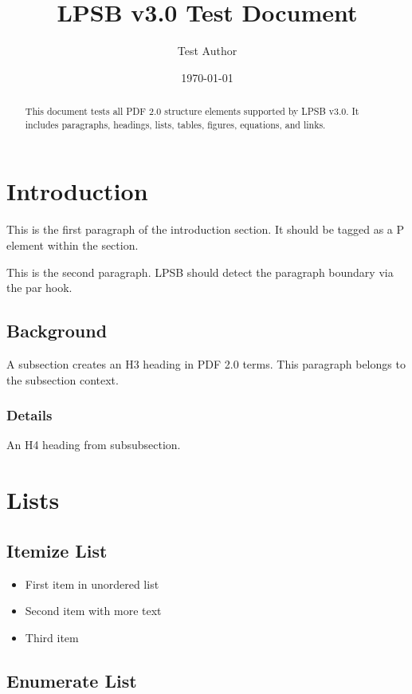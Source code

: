 \documentclass{article}
\title{LPSB v3.0 Test Document}
\author{Test Author}
\date{\today}
\begin{document}
\maketitle

\begin{abstract}
This document tests all PDF 2.0 structure elements supported by LPSB v3.0.
It includes paragraphs, headings, lists, tables, figures, equations, and links.
\end{abstract}

\section{Introduction}

This is the first paragraph of the introduction section.
It should be tagged as a P element within the section.

This is the second paragraph.
LPSB should detect the paragraph boundary via the par hook.

\subsection{Background}

A subsection creates an H3 heading in PDF 2.0 terms.
This paragraph belongs to the subsection context.

\subsubsection{Details}

An H4 heading from subsubsection.

\section{Lists}

\subsection{Itemize List}

\begin{itemize}
\item First item in unordered list
\item Second item with more text
\item Third item
\end{itemize}

\subsection{Enumerate List}
\end{document}
